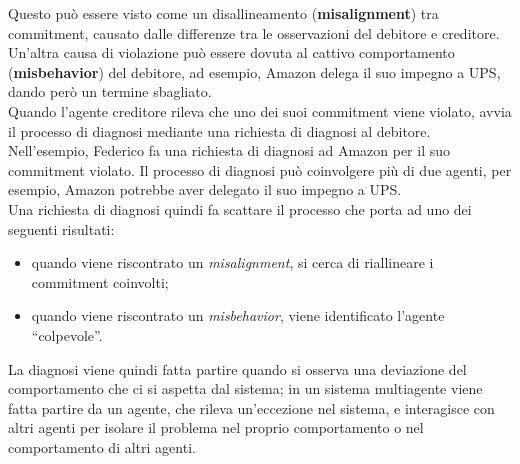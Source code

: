 \documentclass[a4paper,12pt]{report}
\newcommand{\virgolette}[1]{``#1''}
\begin{document}
Questo può essere visto come un disallineamento (\textbf{misalignment}) tra commitment, causato dalle differenze tra le osservazioni del debitore e creditore. Un'altra causa di violazione può essere dovuta al cattivo comportamento (\textbf{misbehavior}) del debitore, ad esempio, Amazon delega il suo impegno a UPS, dando però un termine sbagliato.\\
Quando l'agente creditore rileva che uno dei suoi commitment viene violato, avvia il processo di diagnosi mediante una richiesta di diagnosi al debitore. Nell'esempio, Federico fa una richiesta di diagnosi ad Amazon per il suo commitment violato. Il processo di diagnosi può coinvolgere più di due agenti, per esempio, Amazon potrebbe aver delegato il suo impegno a UPS.\\
Una richiesta di diagnosi quindi fa scattare il processo che porta ad uno dei seguenti risultati:
\begin{itemize}
 \item quando viene riscontrato un \textit{misalignment}, si cerca di riallineare i commitment coinvolti;
 \item quando viene riscontrato un \textit{misbehavior}, viene identificato l'agente \virgolette{colpevole}.
\end{itemize}
La diagnosi viene quindi fatta partire quando si osserva una deviazione del comportamento che ci si aspetta dal sistema; in un sistema multiagente viene fatta partire da un agente, che rileva un'eccezione nel sistema, e interagisce con altri agenti per isolare il problema nel proprio comportamento o nel comportamento di altri agenti.
\newpage
\end{document}

